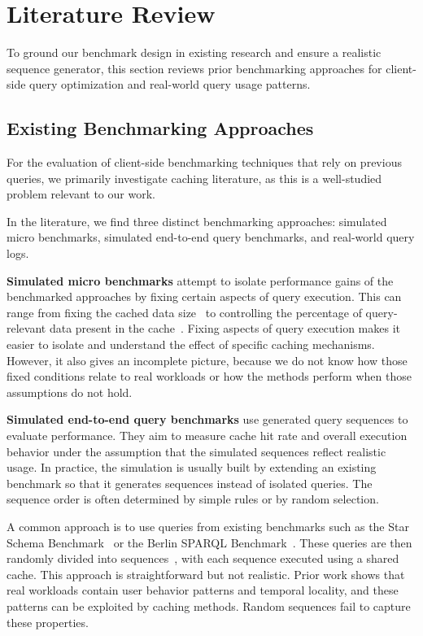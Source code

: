 \section{Literature Review}
\label{sec:related-work}
To ground our benchmark design in existing research and ensure a realistic sequence generator, 
this section reviews prior benchmarking approaches for client-side query optimization and real-world query usage patterns.

\subsection{Existing Benchmarking Approaches}
For the evaluation of client-side benchmarking techniques that rely on previous queries,
we primarily investigate caching literature, as this is a well-studied problem relevant to our work.

In the literature, we find three distinct benchmarking approaches: 
simulated micro benchmarks, simulated end-to-end query benchmarks, and real-world query logs.


\textbf{Simulated micro benchmarks} attempt to isolate performance gains of the benchmarked approaches 
by fixing certain aspects of query execution.
This can range from fixing the cached data size~\cite{hartig2011caching} to controlling the percentage of 
query-relevant data present in the cache~\cite{nicholson2024hpcache}. 
Fixing aspects of query execution makes it easier to isolate and understand the effect of specific caching mechanisms. 
However, it also gives an incomplete picture, because we do not know how those fixed conditions relate to real workloads 
or how the methods perform when those assumptions do not hold.

\textbf{Simulated end-to-end query benchmarks} use generated query sequences to evaluate performance. 
They aim to measure cache hit rate and overall execution behavior under the assumption that the simulated sequences 
reflect realistic usage.
In practice, the simulation is usually built by extending an existing benchmark so that it generates sequences 
instead of isolated queries. 
The sequence order is often determined by simple rules or by random selection.

A common approach is to use queries from existing benchmarks such as the Star Schema Benchmark~\cite{o2009star} 
or the Berlin SPARQL Benchmark~\cite{bizer2011berlin}.
These queries are then randomly divided into sequences~\cite{hartig2011caching,nicholson2024hpcache,folz2016cyclades}, 
with each sequence executed using a shared cache. 
This approach is straightforward but not realistic.
Prior work shows that real workloads contain user behavior patterns and temporal locality, and these patterns can be 
exploited by caching methods.
Random sequences fail to capture these properties.

